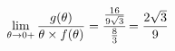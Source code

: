 \documentclass[preview]{standalone}
\begin{document}
\begin{align*}
\lim_{\theta \to 0 +} {g( \theta ) \over {\theta \times f( \theta )}} = \cfrac{\frac{16}{9\sqrt{3}}}{\frac{8}{3}} = \frac{2\sqrt{3}}{9}
\end{align*}
\end{document}
